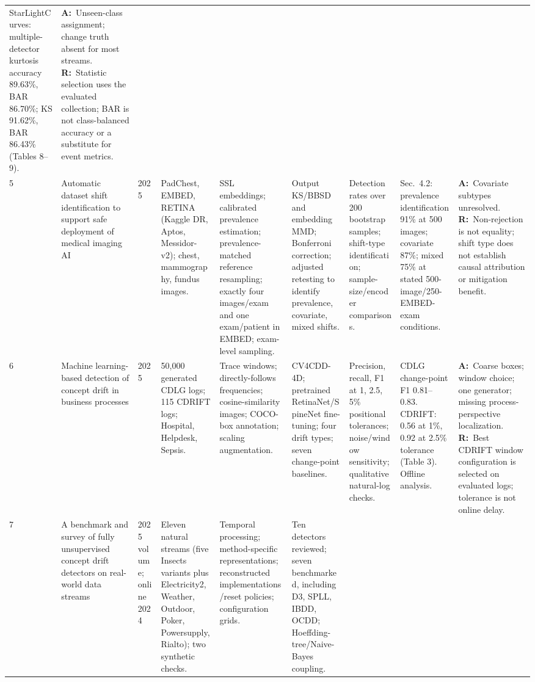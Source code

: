 \documentclass[10pt,a4paper]{article}
\newcommand{\A}{\textbf{A:}\ }
\newcommand{\R}{\textbf{R:}\ }
\begin{document}
\begin{landscape}
\begin{longtable}{L{0.4cm}L{3.5cm}L{0.95cm}L{2.55cm}L{2.65cm}L{2.65cm}L{2.25cm}L{2.65cm}L{3.8cm}}
StarLightCurves: multiple-detector kurtosis accuracy 89.63\%, BAR 86.70\%; KS 91.62\%, BAR 86.43\% (Tables 8--9). &
\A Unseen-class assignment; change truth absent for most streams.
\R Statistic selection uses the evaluated collection; BAR is not class-balanced accuracy or a substitute for event metrics.\\[4pt]
5 & Automatic dataset shift identification to support safe deployment of medical imaging AI \cite{roschewitz} &
2025 & PadChest, EMBED, RETINA (Kaggle DR, Aptos, Messidor-v2); chest, mammography, fundus images. &
SSL embeddings; calibrated prevalence estimation; prevalence-matched reference resampling; exactly four images/exam and one exam/patient in EMBED; exam-level sampling. &
Output KS/BBSD and embedding MMD; Bonferroni correction; adjusted retesting to identify prevalence, covariate, mixed shifts. &
Detection rates over 200 bootstrap samples; shift-type identification; sample-size/encoder comparisons. &
Sec.~4.2: prevalence identification 91\% at 500 images; covariate 87\%; mixed 75\% at stated 500-image/250-EMBED-exam conditions. &
\A Covariate subtypes unresolved.
\R Non-rejection is not equality; shift type does not establish causal attribution or mitigation benefit.\\[4pt]
6 & Machine learning-based detection of concept drift in business processes \cite{kraus} &
2025 & 50,000 generated CDLG logs; 115 CDRIFT logs; Hospital, Helpdesk, Sepsis. &
Trace windows; directly-follows frequencies; cosine-similarity images; COCO-box annotation; scaling augmentation. &
CV4CDD-4D; pretrained RetinaNet/SpineNet fine-tuning; four drift types; seven change-point baselines. &
Precision, recall, F1 at 1, 2.5, 5\% positional tolerances; noise/window sensitivity; qualitative natural-log checks. &
CDLG change-point F1 0.81--0.83. CDRIFT: 0.56 at 1\%, 0.92 at 2.5\% tolerance (Table 3). Offline analysis. &
\A Coarse boxes; window choice; one generator; missing process-perspective localization.
\R Best CDRIFT window configuration is selected on evaluated logs; tolerance is not online delay.\\[4pt]
7 & A benchmark and survey of fully unsupervised concept drift detectors on real-world data streams \cite{lukats} &
2025 volume; online 2024 & Eleven natural streams (five Insects variants plus Electricity2, Weather, Outdoor, Poker, Powersupply, Rialto); two synthetic checks. &
Temporal processing; method-specific representations; reconstructed implementations/reset policies; configuration grids. &
Ten detectors reviewed; seven benchmarked, including D3, SPLL, IBDD, OCDD; Hoeffding-tree/Naive-Bayes coupling. &

\end{longtable}
\end{landscape}
\end{document}
